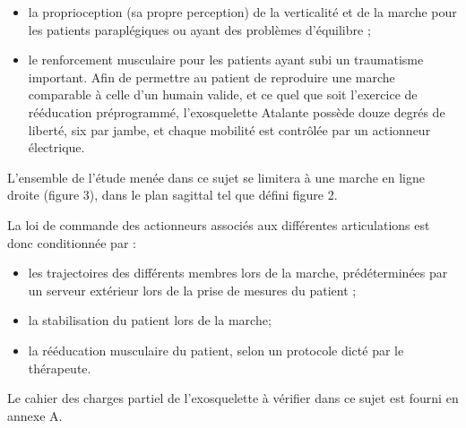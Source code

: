 \documentclass[10pt]{article}
\begin{document}
\begin{itemize}
  \item la proprioception (sa propre perception) de la verticalité et de la marche pour les patients paraplégiques ou ayant des problèmes d'équilibre ;

  \item le renforcement musculaire pour les patients ayant subi un traumatisme important. Afin de permettre au patient de reproduire une marche comparable à celle d'un humain valide, et ce quel que soit l'exercice de rééducation préprogrammé, l'exosquelette Atalante possède douze degrés de liberté, six par jambe, et chaque mobilité est contrôlée par un actionneur électrique.

\end{itemize}

L'ensemble de l'étude menée dans ce sujet se limitera à une marche en ligne droite (figure 3), dans le plan sagittal tel que défini figure 2.

La loi de commande des actionneurs associés aux différentes articulations est donc conditionnée par :

\begin{itemize}
  \item les trajectoires des différents membres lors de la marche, prédéterminées par un serveur extérieur lors de la prise de mesures du patient ;

  \item la stabilisation du patient lors de la marche;

  \item la rééducation musculaire du patient, selon un protocole dicté par le thérapeute.

\end{itemize}

Le cahier des charges partiel de l'exosquelette à vérifier dans ce sujet est fourni en annexe A.
\end{document}
